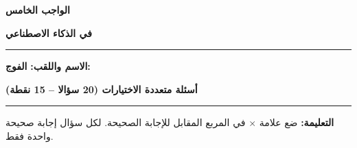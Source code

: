 \documentclass[a4paper]{article}
\newif\ifcorrection
\begin{document}
\begin{center}

{\Large\khatt\textbf{الواجب الخامس}\ifcorrection\ \textbf{-- التصحيح النموذجي}\fi}

\vspace{0.2cm}

{\Large\khatt\textbf{في الذكاء الاصطناعي}}

\end{center}

\rule{\textwidth}{1pt}

\ifcorrection\else
\textbf{الاسم واللقب:} \dotfill \quad \textbf{الفوج:} \makebox[3cm]{\dotfill}

\vspace{0.3cm}
\fi

\begin{center}

{\khatt\textbf{أسئلة متعددة الاختيارات (20 سؤالا -- 15 نقطة)}}

\end{center}

\rule{\textwidth}{1pt}

\textbf{التعليمة:} ضع علامة \textbf{$\times$} في المربع المقابل للإجابة الصحيحة. لكل سؤال إجابة صحيحة واحدة فقط.

\vspace{0.3cm}
\end{document}
